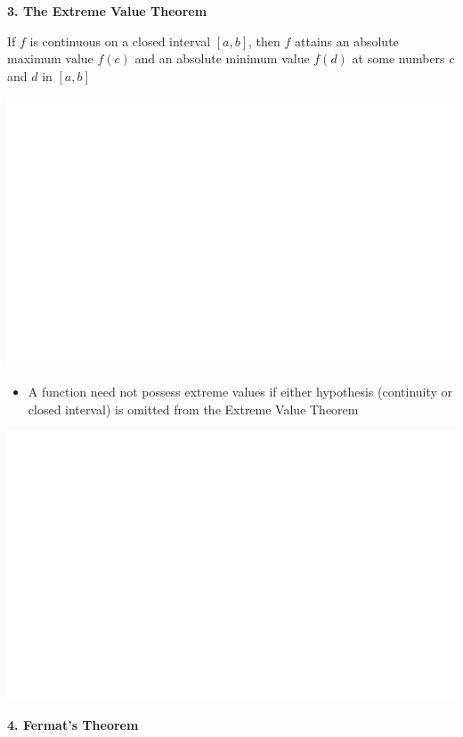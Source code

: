 \documentclass[]{book}
\providecommand{\tightlist}{%
  \setlength{\itemsep}{0pt}\setlength{\parskip}{0pt}}
\begin{document}
\textbf{3. The Extreme Value Theorem}

If \(f\) is continuous on a closed interval \([a,b]\), then \(f\) attains an absolute maximum value \(f(c)\) and an absolute minimum value \(f(d)\) at some numbers \(c\) and \(d\) in \([a,b]\)

\begin{center}\includegraphics[width=1\linewidth]{figure/LB30-1} \end{center}

\begin{itemize}
\tightlist
\item
  A function need not possess extreme values if either hypothesis (continuity or closed interval) is omitted from the Extreme Value Theorem
\end{itemize}

\begin{center}\includegraphics[width=1\linewidth]{figure/LB31-1} \end{center}

\textbf{4. Fermat's Theorem}
\end{document}
